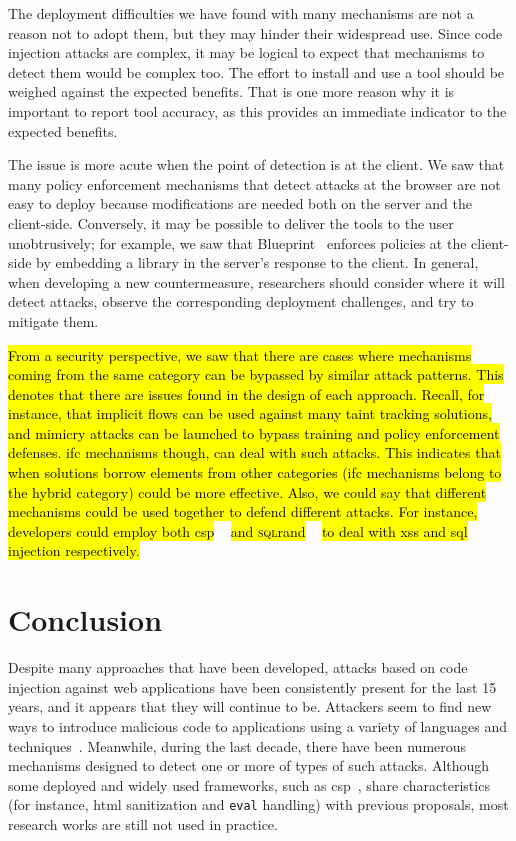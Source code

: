 \documentclass[10pt,journal,compsoc]{IEEEtran}
\newcommand{\hlc}[2][yellow]{ {\sethlcolor{#1} \hl{#2}} }
\begin{document}
The deployment difficulties we have found with many mechanisms are not
a reason not to adopt them, but they may hinder their widespread use.
Since code injection attacks are complex, it may be logical to
expect that mechanisms to detect them would be complex too. The effort
to install and use a tool should be weighed against the expected
benefits. That is one more reason why it is important to report tool
accuracy, as this provides an immediate indicator to the expected
benefits. 

The issue is more acute when the point of detection is at the client.
We saw that many policy enforcement mechanisms that detect attacks at
the browser are not easy to deploy because modifications are needed
both on the server and the client-side.
Conversely, it may be possible to deliver
the tools to the user unobtrusively; for example, we saw that
Blueprint~\cite{LV09} enforces policies at the client-side by embedding a library
in the server's response to the client. In general, when developing a
new countermeasure, researchers should consider where it
will detect attacks, observe the corresponding deployment
challenges, and try to mitigate them.

\hlc[yellow]{From a security perspective,
we saw that there are cases where
mechanisms coming from the same category
can be bypassed by similar attack patterns.
This denotes that there are issues
found in the design of each approach.
Recall,
for instance,
that implicit flows can be used against
many taint tracking solutions,
and mimicry attacks can be launched
to bypass training and policy enforcement defenses.
{\sc ifc} mechanisms though,
can deal with such attacks.
This indicates that when solutions
borrow elements from other categories
({\sc ifc} mechanisms
belong to the hybrid category)
could be more effective.
Also,
we could say that different mechanisms could
be used together to defend different attacks.
For instance,
developers could employ both {\sc csp}}~\cite{SSM10}
\hlc[yellow]{and \textsc{sql}rand}~\cite{BK04}
\hlc[yellow]{to deal with {\sc xss}
and {\sc sql} injection respectively.}

\vspace{-0.3mm}
\section{Conclusion}
\label{sec:conclusion}
\vspace{-0.3mm}

Despite many approaches that have been developed,
attacks based on code injection against web applications
have been consistently present for the last 15 years,
and it appears that they will continue to be.
Attackers seem to find new ways to introduce
malicious code to applications using a
variety of languages and techniques~\cite{HNSHS12,DKH14}.
Meanwhile, during the last decade, there have been
numerous mechanisms designed to
detect one or more of types of such attacks.
Although some deployed and widely used frameworks, 
such as {\sc csp}~\cite{SSM10},
share characteristics
(for instance, {\sc html} sanitization and {\tt eval} handling)
with previous proposals, 
most research works are still not used in practice.
\end{document}
